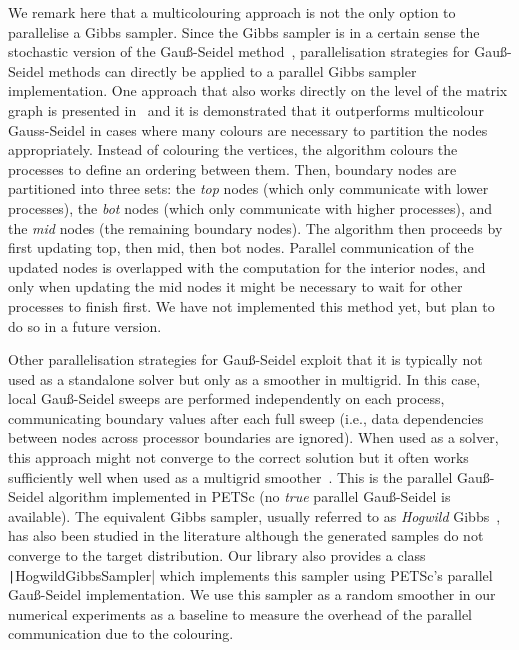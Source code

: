 \documentclass[
fontsize=11pt,
paper=a4,
numbers=noenddot
]{scrartcl}
\begin{document}
We remark here that a multicolouring approach is not the only option to parallelise a Gibbs sampler. Since the Gibbs sampler is in a certain sense the stochastic version of the Gauß-Seidel method~\cite{goodmansokal,foxparker}, parallelisation strategies for Gauß-Seidel methods can directly be applied to a parallel Gibbs sampler implementation. One approach that also works directly on the level of the matrix graph is presented in~\cite{adams2001} and it is demonstrated that it outperforms multicolour Gauss-Seidel in cases where many colours are necessary to partition the nodes appropriately. Instead of colouring the vertices, the algorithm colours the processes to define an ordering between them. Then, boundary nodes are partitioned into three sets: the \emph{top} nodes (which only communicate with lower processes), the \emph{bot} nodes (which only communicate with higher processes), and the \emph{mid} nodes (the remaining boundary nodes). The algorithm then proceeds by first updating top, then mid, then bot nodes. Parallel communication of the updated nodes is overlapped with the computation for the interior nodes, and only when updating the mid nodes it might be necessary to wait for other processes to finish first. We have not implemented this method yet, but plan to do so in a future version.

Other parallelisation strategies for Gauß-Seidel exploit that it is typically not used as a standalone solver but only as a smoother in multigrid. In this case, local Gauß-Seidel sweeps are performed independently on each process, communicating boundary values after each full sweep (i.e., data dependencies between nodes across processor boundaries are ignored). When used as a solver, this approach might not converge to the correct solution but it often works sufficiently well when used as a multigrid smoother~\cite{parmultigrid}. This is the parallel Gauß-Seidel algorithm implemented in PETSc (no \emph{true} parallel Gauß-Seidel is available).  The equivalent Gibbs sampler, usually referred to as \emph{Hogwild} Gibbs~\cite{hogwild}, has also been studied in the literature although the generated samples do not converge to the target distribution. Our library also provides a class  \texttt|HogwildGibbsSampler| which implements this sampler using PETSc's parallel Gauß-Seidel implementation. We use this sampler as a random smoother in our numerical experiments as a baseline to measure the overhead of the parallel communication due to the colouring.

\end{document}
